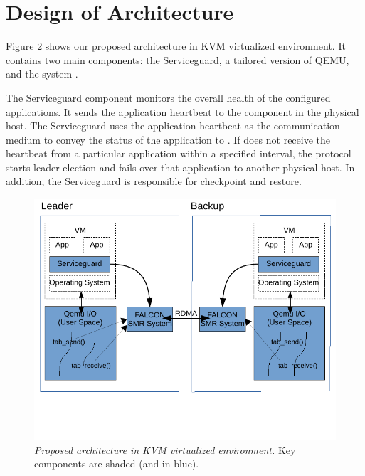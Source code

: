 \section{Design of Architecture} \label{sec:overview}

Figure 2 shows our proposed architecture in KVM virtualized environment. 
It contains two main components: the Serviceguard, a tailored version 
of QEMU, and the \smr system \smrsystem .

The Serviceguard component monitors the overall health of the configured applications. 
It sends the application heartbeat to the \smrsystem component in the physical 
host. The Serviceguard uses the application heartbeat as the communication 
medium to convey the status of the application to \smrsystem. If \smrsystem does not 
receive the heartbeat from a particular application within a specified interval, 
the protocol starts leader election and fails over that application to another physical 
host. In addition, the Serviceguard is responsible for checkpoint and restore. 

\begin{figure}[t]
\centering
\includegraphics[width=.47\textwidth]{figures/arch}
\vspace{-.2in}
\caption{{\em Proposed architecture in KVM virtualized environment.} Key components are shaded (and
in blue).} \label{fig:arc}
\vspace{.05in}
\end{figure}

